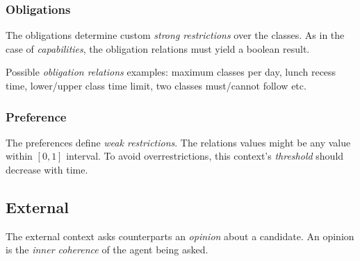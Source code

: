 \subsubsection{Obligations}

The obligations determine custom \emph{strong restrictions} over the classes.
As in the case of \emph{capabilities}, the obligation relations must yield a
boolean result.

Possible \emph{obligation relations} examples: maximum classes per day,
lunch recess time, lower/upper class time limit, two classes must/cannot follow etc.


\subsubsection{Preference}

The preferences define \emph{weak restrictions}. The relations values might be any
value within $[0,1]$ interval. To avoid overrestrictions, this context's \emph{threshold}
should decrease with time.


\subsection{External}

The external context asks counterparts an \emph{opinion} about a candidate.
An opinion is the \emph{inner coherence} of the agent being asked.


%
